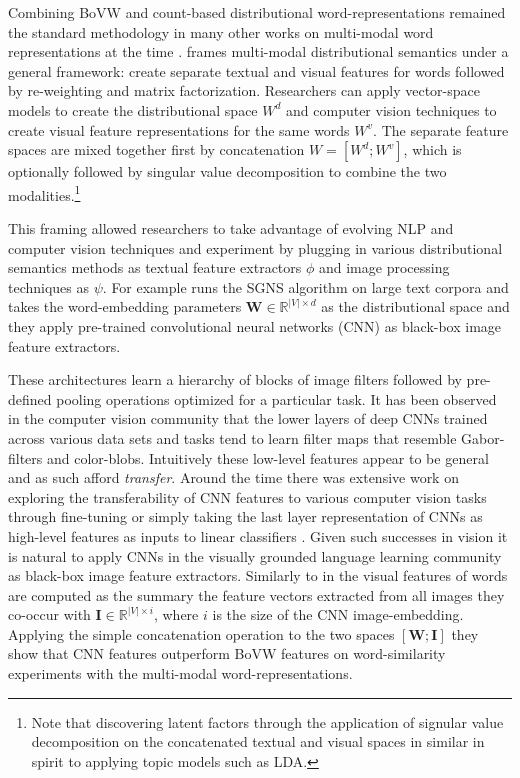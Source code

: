 Combining BoVW and count-based distributional word-representations remained the standard methodology
in many other works on multi-modal word representations at the time
\citep{bruni2011distributional,leong2011going,leong2011measuring}.
\cite{bruni2014multimodal} frames multi-modal distributional semantics under a general framework: 
create separate textual and visual features for words followed by
re-weighting and matrix factorization. Researchers can apply vector-space
models to create the distributional space $W^d$ and computer vision techniques to create
visual feature representations for the same words $W^v$. The separate feature spaces
are mixed together  first  by concatenation $W = [W^d;W^v]$, which is
optionally followed by singular value decomposition
to combine the two modalities.\footnote{Note that discovering latent factors through the application
of signular value decomposition on the concatenated textual and visual spaces in similar in spirit
to applying topic models such as LDA.} 

This framing allowed researchers to take advantage of evolving NLP and computer vision techniques
and experiment by plugging in various distributional semantics methods as textual feature extractors
$\phi$ and image processing techniques as $\psi$.
For example \cite{kiela2014learning} runs the SGNS algorithm
on large text corpora and takes the word-embedding parameters
$\mathbf{W} \in \mathbb{R}^{|V| \times d}$ as the distributional space and
they apply pre-trained convolutional neural networks (CNN) as black-box image
feature extractors. 

These architectures learn a hierarchy of blocks of image filters followed by
pre-defined pooling operations optimized for a particular task.
It has been observed in the computer vision community that the lower layers of
deep CNNs trained across various data sets and tasks tend to learn filter maps
that resemble Gabor-filters and color-blobs. Intuitively these low-level features appear to be general
and as such afford \emph{transfer}. Around the time there was extensive work on exploring the transferability
of CNN features to various computer vision tasks through fine-tuning
 \citep{donahue2014decaf,oquab2014learning} or simply taking the last layer representation of CNNs
as high-level features as inputs to linear classifiers \citep{girshick2014rich,sharif2014cnn}.
Given such successes in vision it is natural to apply CNNs in the visually grounded language learning
community as black-box image feature extractors. Similarly to \cite{bruni2014multimodal} in
\cite{kiela2014learning} the visual features of words are computed as the summary the feature vectors
extracted from all images they co-occur with $\mathbf{I} \in \mathbb{R}^{|V| \times i}$, where $i$ is
the size of the CNN image-embedding.
Applying the simple concatenation operation to the two spaces $[\mathbf{W};\mathbf{I}]$
they show that CNN features outperform BoVW features on word-similarity
experiments with the multi-modal word-representations.

